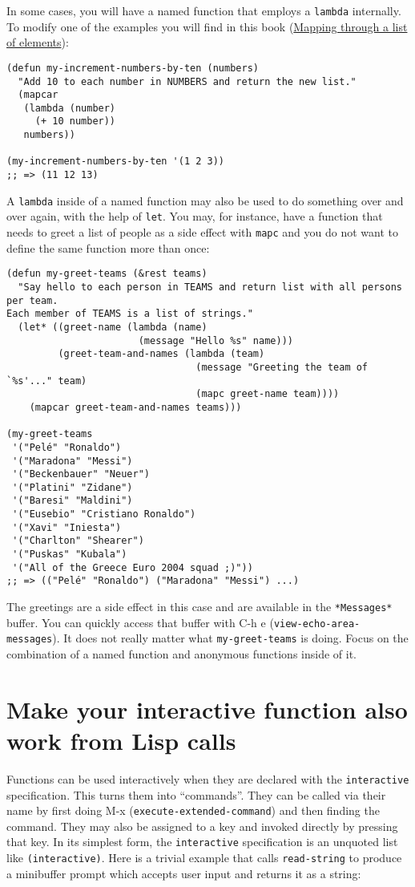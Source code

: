 \documentclass[11pt]{ctexart}
\begin{document}
In some cases, you will have a named function that employs a \texttt{lambda} internally. To modify one of the examples you will find in this book (\hyperref[sec:org29370c2]{Mapping through a list of elements}):

\begin{verbatim}
(defun my-increment-numbers-by-ten (numbers)
  "Add 10 to each number in NUMBERS and return the new list."
  (mapcar
   (lambda (number)
     (+ 10 number))
   numbers))

(my-increment-numbers-by-ten '(1 2 3))
;; => (11 12 13)
\end{verbatim}

A \texttt{lambda} inside of a named function may also be used to do something over and over again, with the help of \texttt{let}. You may, for instance, have a function that needs to greet a list of people as a side effect with \texttt{mapc} and you do not want to define the same function more than once:

\begin{verbatim}
(defun my-greet-teams (&rest teams)
  "Say hello to each person in TEAMS and return list with all persons per team.
Each member of TEAMS is a list of strings."
  (let* ((greet-name (lambda (name)
                       (message "Hello %s" name)))
         (greet-team-and-names (lambda (team)
                                 (message "Greeting the team of `%s'..." team)
                                 (mapc greet-name team))))
    (mapcar greet-team-and-names teams)))

(my-greet-teams
 '("Pelé" "Ronaldo")
 '("Maradona" "Messi")
 '("Beckenbauer" "Neuer")
 '("Platini" "Zidane")
 '("Baresi" "Maldini")
 '("Eusebio" "Cristiano Ronaldo")
 '("Xavi" "Iniesta")
 '("Charlton" "Shearer")
 '("Puskas" "Kubala")
 '("All of the Greece Euro 2004 squad ;)"))
;; => (("Pelé" "Ronaldo") ("Maradona" "Messi") ...)
\end{verbatim}

The greetings are a side effect in this case and are available in the \texttt{*Messages*} buffer. You can quickly access that buffer with C-h e (\texttt{view-echo-area-messages}). It does not really matter what \texttt{my-greet-teams} is doing. Focus on the combination of a named function and anonymous functions inside of it.
\section{Make your interactive function also work from Lisp calls}
\label{sec:org10592f7}
Functions can be used interactively when they are declared with the \texttt{interactive} specification. This turns them into ``commands''. They can be called via their name by first doing M-x (\texttt{execute-extended-command}) and then finding the command. They may also be assigned to a key and invoked directly by pressing that key. In its simplest form, the \texttt{interactive} specification is an unquoted list like \texttt{(interactive)}. Here is a trivial example that calls \texttt{read-string} to produce a minibuffer prompt which accepts user input and returns it as a string:
\end{document}
